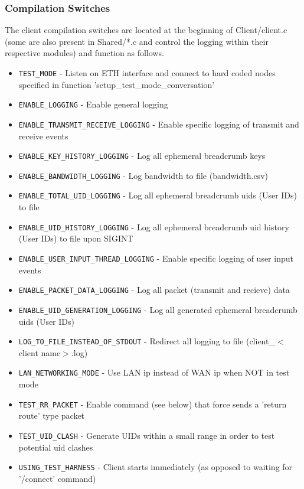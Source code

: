 \documentclass{article}
\begin{document}
\subsubsection{Compilation Switches}
The client compilation switches are located at the beginning of Client/client.c (some are also present in Shared/*.c and control the logging within their respective modules) and function as follows.
\begin{itemize}
	\item \texttt{TEST\_MODE} - Listen on ETH interface and connect to hard coded nodes specified in function 'setup\_test\_mode\_conversation'
	\item \texttt{ENABLE\_LOGGING} - Enable general logging
	\item \texttt{ENABLE\_TRANSMIT\_RECEIVE\_LOGGING} - Enable specific logging of transmit and receive events
	\item \texttt{ENABLE\_KEY\_HISTORY\_LOGGING} - Log all ephemeral breadcrumb keys
	\item \texttt{ENABLE\_BANDWIDTH\_LOGGING} - Log bandwidth to file (bandwidth.csv)
	\item \texttt{ENABLE\_TOTAL\_UID\_LOGGING} - Log all ephemeral breadcrumb uids (User IDs) to file
	\item \texttt{ENABLE\_UID\_HISTORY\_LOGGING} - Log all ephemeral breadcrumb uid history (User IDs) to file upon SIGINT
	\item \texttt{ENABLE\_USER\_INPUT\_THREAD\_LOGGING} - Enable specific logging of user input events
	\item \texttt{ENABLE\_PACKET\_DATA\_LOGGING} - Log all packet (transmit and recieve) data
	\item \texttt{ENABLE\_UID\_GENERATION\_LOGGING} - Log all generated ephemeral breadcrumb uids (User IDs)
	\item \texttt{LOG\_TO\_FILE\_INSTEAD\_OF\_STDOUT} - Redirect all logging to file (client\_$<$client name$>$.log)
	\item \texttt{LAN\_NETWORKING\_MODE} - Use LAN ip instead of WAN ip when NOT in test mode
	\item \texttt{TEST\_RR\_PACKET} - Enable command (see below) that force sends a 'return route' type packet
	\item \texttt{TEST\_UID\_CLASH} - Generate UIDs within a small range in order to test potential uid clashes
	\item \texttt{USING\_TEST\_HARNESS} - Client starts immediately (as opposed to waiting for '/connect' command)
\end{itemize}
\end{document}
